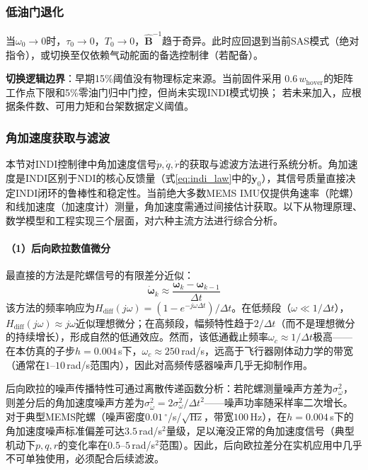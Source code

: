 \subsubsection{低油门退化}

当$\omega_0\to 0$时，$\tau_0\to 0$，$T_0\to 0$，$\hat{\mathbf{B}}^{-1}$趋于奇异。此时应回退到当前SAS模式（绝对指令），或切换至仅依赖气动舵面的备选控制律（若配备）。

\textbf{切换逻辑边界}：早期15\%阈值没有物理标定来源。当前固件采用
$0.6\,w_{\mathrm{hover}}$的矩阵工作点下限和5\%零油门归中门控，但尚未实现INDI模式切换；
若未来加入，应根据条件数、可用力矩和台架数据定义阈值。

\subsubsection{角加速度获取与滤波}
\label{sec:accel_estimation}

本节对INDI控制律中角加速度信号$\dot{p},\dot{q},\dot{r}$的获取与滤波方法进行系统分析。角加速度是INDI区别于NDI的核心反馈量（式\ref{eq:indi_law}中的$\dot{\mathbf{y}}_0$），其信号质量直接决定INDI闭环的鲁棒性和稳定性。当前绝大多数MEMS IMU仅提供角速率（陀螺）和线加速度（加速度计）测量，角加速度需通过间接估计获取。以下从物理原理、数学模型和工程实现三个层面，对六种主流方法进行综合分析。

\paragraph{（1）后向欧拉数值微分}

最直接的方法是陀螺信号的有限差分近似：
\begin{equation}
    \dot{\boldsymbol{\omega}}_k \approx \frac{\boldsymbol{\omega}_k - \boldsymbol{\omega}_{k-1}}{\Delta t}
    \label{eq:bwd_euler}
\end{equation}
该方法的频率响应为$H_{\mathrm{diff}}(j\omega) = (1 - e^{-j\omega\Delta t})/\Delta t$。在低频段（$\omega \ll 1/\Delta t$），$H_{\mathrm{diff}}(j\omega) \approx j\omega$近似理想微分；在高频段，幅频特性趋于$2/\Delta t$（而不是理想微分的持续增长），形成自然的低通效应。然而，该低通截止频率$\omega_c \approx 1/\Delta t$极高——在本仿真的子步$h=0.004$\,s下，$\omega_c\approx 250$\,rad/s，远高于飞行器刚体动力学的带宽（通常在$1$--$10$\,rad/s范围内），因此对高频传感器噪声几乎无抑制作用。

后向欧拉的噪声传播特性可通过离散传递函数分析：若陀螺测量噪声方差为$\sigma_\omega^2$，则差分后的角加速度噪声方差为$\sigma_{\dot{\omega}}^2 = 2\sigma_\omega^2/\Delta t^2$——噪声功率随采样率二次增长。对于典型MEMS陀螺（噪声密度$0.01$\,$^\circ$/s/$\sqrt{\text{Hz}}$，带宽$100$\,Hz），在$h=0.004$\,s下的角加速度噪声标准偏差可达$3.5$\,rad/s$^2$量级，足以淹没正常的角加速度信号（典型机动下$p,q,r$的变化率在$0.5$--$5$\,rad/s$^2$范围）。因此，后向欧拉差分在实机应用中几乎不可单独使用，必须配合后续滤波。

